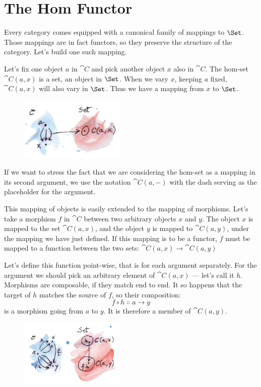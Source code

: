 \section{The Hom Functor}

Every category comes equipped with a canonical family of mappings to
$\Set$. Those mappings are in fact functors, so they preserve the
structure of the category. Let's build one such mapping.

Let's fix one object $a$ in $\cat{C}$ and pick another object
$x$ also in $\cat{C}$. The hom-set $\cat{C}(a, x)$ is a set, an
object in $\Set$. When we vary $x$, keeping $a$
fixed, $\cat{C}(a, x)$ will also vary in $\Set$. Thus we have a
mapping from $x$ to $\Set$.

\begin{figure}[H]
\centering
\includegraphics[width=50mm]{images/hom-set.jpg}
\end{figure}

\noindent
If we want to stress the fact that we are considering the hom-set as a
mapping in its second argument, we use the notation $\cat{C}(a, -)$
with the dash serving as the placeholder for the argument.

This mapping of objects is easily extended to the mapping of morphisms.
Let's take a morphism $f$ in $\cat{C}$ between two arbitrary
objects $x$ and $y$. The object $x$ is mapped to
the set $\cat{C}(a, x)$, and the object $y$ is mapped to
$\cat{C}(a, y)$, under the mapping we have just defined. If this
mapping is to be a functor, $f$ must be mapped to a function
between the two sets: $\cat{C}(a, x) \to \cat{C}(a, y)$

Let's define this function point-wise, that is for each argument
separately. For the argument we should pick an arbitrary element of
$\cat{C}(a, x)$ --- let's call it $h$. Morphisms are
composable, if they match end to end. It so happens that the target of
$h$ matches the source of $f$, so their composition:
\[f \circ h \Colon a \to y\]
is a morphism going from $a$ to $y$. It is therefore a
member of $\cat{C}(a, y)$.

\begin{figure}[H]
\centering
\includegraphics[width=50mm]{images/hom-functor.jpg}
\end{figure}


